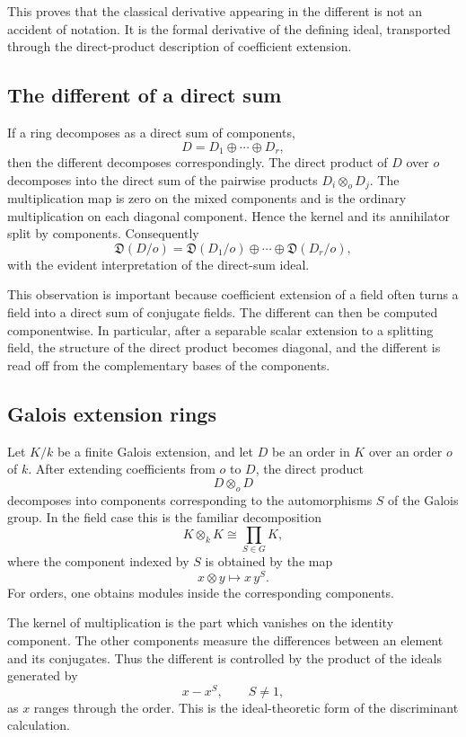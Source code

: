 \documentclass[12pt]{article}
\begin{document}
This proves that the classical derivative appearing in the different is not an accident of notation. It is the formal derivative of the defining ideal, transported through the direct-product description of coefficient extension.

\subsection{The different of a direct sum}

If a ring decomposes as a direct sum of components,
\[
  D=D_1\oplus\cdots\oplus D_r,
\]
then the different decomposes correspondingly. The direct product of \(D\) over \(o\) decomposes into the direct sum of the pairwise products \(D_i\otimes_o D_j\). The multiplication map is zero on the mixed components and is the ordinary multiplication on each diagonal component. Hence the kernel and its annihilator split by components. Consequently
\[
  \mathfrak D(D/o)=\mathfrak D(D_1/o)\oplus\cdots\oplus\mathfrak D(D_r/o),
\]
with the evident interpretation of the direct-sum ideal.

This observation is important because coefficient extension of a field often turns a field into a direct sum of conjugate fields. The different can then be computed componentwise. In particular, after a separable scalar extension to a splitting field, the structure of the direct product becomes diagonal, and the different is read off from the complementary bases of the components.

\subsection{Galois extension rings}

Let \(K/k\) be a finite Galois extension, and let \(D\) be an order in \(K\) over an order \(o\) of \(k\). After extending coefficients from \(o\) to \(D\), the direct product
\[
  D\otimes_o D
\]
decomposes into components corresponding to the automorphisms \(S\) of the Galois group. In the field case this is the familiar decomposition
\[
  K\otimes_k K \cong \prod_{S\in G} K,
\]
where the component indexed by \(S\) is obtained by the map
\[
  x\otimes y\longmapsto x\,y^S.
\]
For orders, one obtains modules inside the corresponding components.

The kernel of multiplication is the part which vanishes on the identity component. The other components measure the differences between an element and its conjugates. Thus the different is controlled by the product of the ideals generated by
\[
  x-x^S,
  \qquad S\ne 1,
\]
as \(x\) ranges through the order. This is the ideal-theoretic form of the discriminant calculation.
\end{document}
